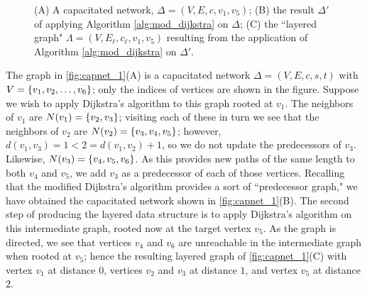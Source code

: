 \documentclass[m3380-lec-main.tex]{subfiles}
\begin{document}
\begin{figure}[hbt]
\begin{center}
\end{center}
\caption{\label{fig:capnet_1}(A) A capacitated network, $\Delta=(V,E,c,v_1,v_5)$; (B) the result $\Delta'$ of applying Algorithm \ref{alg:mod_dijkstra} on $\Delta$; (C) the ``layered graph" $\Lambda=(V,E_\ell,c_\ell,v_1,v_5)$ resulting from the application of Algorithm \ref{alg:mod_dijkstra} on $\Delta'$.}
\end{figure}

\begin{exmp}\label{exmp:capnet_1}
The graph in \autoref{fig:capnet_1}(A) is a capacitated network $\Delta=(V,E,c,s,t)$ with $V=\left\{v_1,v_2,\ldots,v_6\right\}$; only the indices of vertices are shown in the figure. Suppose we wish to apply Dijkstra's algorithm to this graph rooted at $v_1$. The neighbors of $v_1$ are $N(v_1)=\left\{v_2,v_3\right\}$; visiting each of these in turn we see that the neighbors of $v_2$ are $N(v_2)=\left\{v_3,v_4,v_5\right\}$; however, $d(v_1,v_3)=1<2=d(v_1,v_2)+1$, so we do not update the predecessors of $v_3$. Likewise, $N(v_3) = \left\{v_4,v_5,v_6\right\}$. As this provides new paths of the same length to both $v_4$ and $v_5$, we add $v_3$ as a predecessor of each of those vertices. Recalling that the modified Dijkstra's algorithm provides a sort of ``predecessor graph," we have obtained the capacitated network shown in \autoref{fig:capnet_1}(B). The second step of producing the layered data structure is to apply Dijkstra's algorithm on this intermediate graph, rooted now at the target vertex $v_5$. As the graph is directed, we see that vertices $v_4$ and $v_6$ are unreachable in the intermediate graph when rooted at $v_5$; hence the resulting layered graph of \autoref{fig:capnet_1}(C) with vertex $v_1$ at distance $0$, vertices $v_2$ and $v_3$ at distance $1$, and vertex $v_5$ at distance $2$.
\end{exmp}
\end{document}

